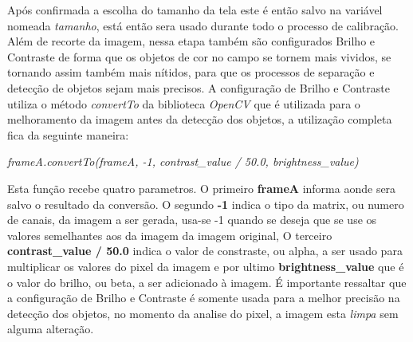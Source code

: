  Após confirmada a escolha do tamanho da tela 
este é então salvo na variável nomeada \textit{tamanho}, está então sera usado durante todo o processo de calibração.
Além de recorte da imagem, nessa etapa também são configurados Brilho e Contraste de forma que os objetos de cor no campo se tornem mais vividos, se tornando assim também mais nítidos, para que os processos de separação e detecção de objetos sejam mais precisos.	A configuração de Brilho e Contraste utiliza o método \textit{convertTo} da biblioteca \textit{OpenCV} que é utilizada para o melhoramento da imagem antes da detecção dos objetos, a utilização completa fica da seguinte maneira:
\begin{center}
\centering \textit{ frameA.convertTo(frameA, -1, contrast\_value / 50.0, brightness\_value)}
\end{center}
Esta função recebe quatro parametros. O primeiro \textbf{frameA} informa aonde sera salvo o resultado da conversão. O segundo \textbf{-1} indica o tipo da matrix, ou numero de canais, da imagem a ser gerada, usa-se -1 quando se deseja que se use os valores semelhantes aos da imagem da imagem original\cite{OpenCV}, O terceiro \textbf{contrast\_value / 50.0} indica o valor de constraste, ou alpha, a ser usado para multiplicar os valores do pixel da imagem\cite{OpenCV} e por ultimo \textbf{brightness\_value} que é o valor do brilho, ou beta, a ser adicionado à imagem. É importante ressaltar que a configuração de  Brilho e Contraste é somente usada para a melhor precisão na detecção dos objetos, no momento da analise do pixel, a imagem esta \textit{limpa} sem alguma alteração.\newline

